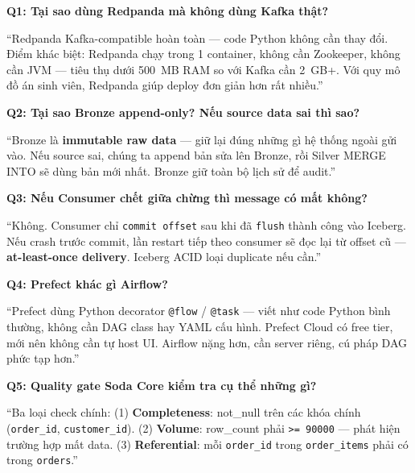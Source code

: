 \documentclass[12pt, a4paper]{article}
\newcommand{\code}[1]{\texttt{\small#1}}
\begin{document}
\begin{tcolorbox}[colback=gray!5, colframe=gray!50, arc=4pt,
  title={\faQuestion\ 7 câu hỏi thầy cô hay hỏi}]

\textbf{Q1: Tại sao dùng Redpanda mà không dùng Kafka thật?}

\begin{scriptbox}
``Redpanda Kafka-compatible hoàn toàn --- code Python không cần thay đổi.
Điểm khác biệt: Redpanda chạy trong 1 container, không cần Zookeeper,
không cần JVM --- tiêu thụ dưới 500~MB RAM so với Kafka cần 2~GB+.
Với quy mô đồ án sinh viên, Redpanda giúp deploy đơn giản hơn rất nhiều.''
\end{scriptbox}

\textbf{Q2: Tại sao Bronze append-only? Nếu source data sai thì sao?}

\begin{scriptbox}
``Bronze là \textbf{immutable raw data} --- giữ lại đúng những gì hệ thống
ngoài gửi vào. Nếu source sai, chúng ta append bản sửa lên Bronze,
rồi Silver MERGE INTO sẽ dùng bản mới nhất. Bronze giữ toàn bộ
lịch sử để audit.''
\end{scriptbox}

\textbf{Q3: Nếu Consumer chết giữa chừng thì message có mất không?}

\begin{scriptbox}
``Không. Consumer chỉ \code{commit offset} sau khi đã \code{flush} thành
công vào Iceberg. Nếu crash trước commit, lần restart tiếp theo
consumer sẽ đọc lại từ offset cũ --- \textbf{at-least-once delivery}.
Iceberg ACID loại duplicate nếu cần.''
\end{scriptbox}

\textbf{Q4: Prefect khác gì Airflow?}

\begin{scriptbox}
``Prefect dùng Python decorator \code{@flow} / \code{@task} --- viết như
code Python bình thường, không cần DAG class hay YAML cấu hình.
Prefect Cloud có free tier, mới nên không cần tự host UI.
Airflow nặng hơn, cần server riêng, cú pháp DAG phức tạp hơn.''
\end{scriptbox}

\textbf{Q5: Quality gate Soda Core kiểm tra cụ thể những gì?}

\begin{scriptbox}
``Ba loại check chính:
(1) \textbf{Completeness}: not\_null trên các khóa chính (\code{order\_id}, \code{customer\_id}).
(2) \textbf{Volume}: row\_count phải \code{>= 90000} --- phát hiện trường hợp mất data.
(3) \textbf{Referential}: mỗi \code{order\_id} trong \code{order\_items} phải có trong \code{orders}.''
\end{scriptbox}


\end{tcolorbox}
\end{document}
